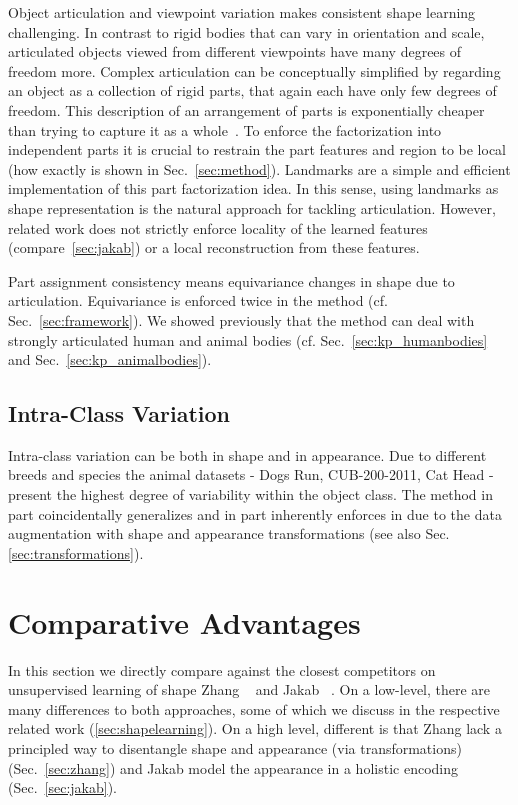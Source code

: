 		Object articulation and viewpoint variation makes consistent shape learning challenging. In contrast to rigid bodies that can vary in orientation and scale, articulated objects viewed from different viewpoints have many degrees of freedom more.
		Complex articulation can be conceptually simplified by regarding an object as a collection of rigid parts, that again each have only few degrees of freedom. This description of an arrangement of parts is exponentially cheaper than trying to capture it as a whole~\cite{ross06parts}. To enforce the factorization into independent parts it is crucial to restrain the part features and region to be local (how exactly is shown in Sec.~\ref{sec:method}). Landmarks are a simple and efficient implementation of this part factorization idea. In this sense, using landmarks as shape representation is the natural approach for tackling articulation. However, related work does not strictly enforce locality of the learned features (compare~\ref{sec:jakab}) or a local reconstruction from these features.


		Part assignment consistency means equivariance \wrt changes in shape due to articulation. Equivariance is enforced twice in the method (cf. Sec.~\ref{sec:framework}).
		We showed previously that the method can deal with strongly articulated human and animal bodies (cf. Sec.~\ref{sec:kp_humanbodies} and Sec.~\ref{sec:kp_animalbodies}).

	\subsection{Intra-Class Variation}\label{sec:intraclass}
		Intra-class variation can be both in shape and in appearance. Due to different breeds and species the animal datasets - Dogs Run, CUB-200-2011, Cat Head - present the highest degree of variability within the object class. The method in part coincidentally generalizes and in part inherently enforces in due to the data augmentation with shape and appearance transformations (see also Sec. \ref{sec:transformations}).

\section{Comparative Advantages}\label{sec:compare}
		In this section we directly compare against the closest competitors on unsupervised learning of shape Zhang \etal~\cite{zhang18} and Jakab \etal~\cite{jakab18}. On a low-level, there are many differences to both approaches, some of which we discuss in the respective related work (\ref{sec:shapelearning}). On a high level, different is that Zhang \etal lack a principled way to disentangle shape and appearance (\eg via transformations) (Sec.~\ref{sec:zhang}) and Jakab \etal model the appearance in a holistic encoding (Sec.~\ref{sec:jakab}).

